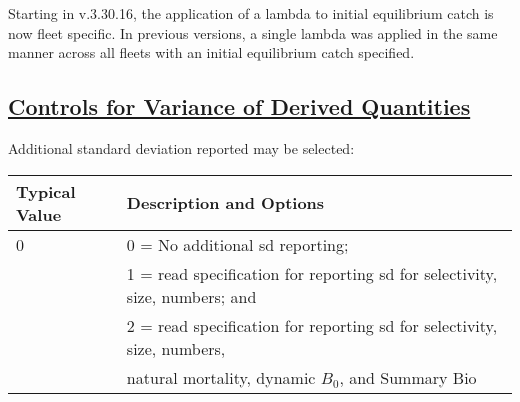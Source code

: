 Starting in v.3.30.16, the application of a lambda to initial equilibrium catch is now fleet specific. In previous versions, a single lambda was applied in the same manner across all fleets with an initial equilibrium catch specified.

\hypertarget{ControlsVarDer}{}
\subsection[Controls for Variance of Derived Quantities]{\protect\hyperlink{ControlsVarDer}{Controls for Variance of Derived Quantities}}
Additional standard deviation reported may be selected:

\begin{longtable}{p{1.1cm} p{1.4cm} p{1.2cm} p{1.2cm} p{1.3cm} p{1.6cm} p{1.4cm} p{1.4cm} p{1.4cm}}

	\hline
	\multicolumn{3}{l}{Typical Value} & \multicolumn{6}{l}{Description and Options} \Tstrut\Bstrut\\
	\hline
	\endfirsthead


	\multicolumn{3}{l}{0} & \multicolumn{6}{l}{0 = No additional \gls{sd} reporting;} \Tstrut\\
	\multicolumn{3}{l}{ } & \multicolumn{6}{l}{1 = read specification for reporting \gls{sd} for selectivity, size, numbers; and} \Bstrut\\
	\multicolumn{3}{l}{ } & \multicolumn{6}{l}{2 = read specification for reporting \gls{sd} for selectivity, size, numbers,} \Bstrut\\
	\multicolumn{3}{l}{ } & \multicolumn{6}{l}{natural mortality, dynamic $B_{0}$, and Summary Bio} \Bstrut\\
	\hline

\end{longtable}

